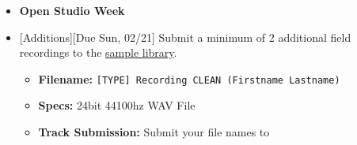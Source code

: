 \def\dMon{Mon, 02/15}
\def\dTues{Tues, 02/16}
\def\dWed{Wed, 02/17}
\def\dThur{Thur, 02/18}
\def\dFri{Fri, 02/19}
\def\dSat{Sat, 02/20}
\def\dSun{Sun, 02/21}
\placeDate

\begin{itemize}[noitemsep,topsep=0pt,leftmargin=*]
        \item \textcolor{defaultColor}{\textbf{Open Studio Week}}
        \item {}[Additions][Due \dSun] \newline
              Submit a minimum of 2 additional field recordings to the \href{\samplelibPermURL}{sample library}.
              \begin{itemize}
                      \item \textbf{Filename:} \texttt{[TYPE] Recording CLEAN (Firstname Lastname)}
                      \item \textbf{Specs:} 24bit 44100hz WAV File
                      \item \textbf{Track Submission:} Submit your file names to \discordS
              \end{itemize}
\end{itemize}